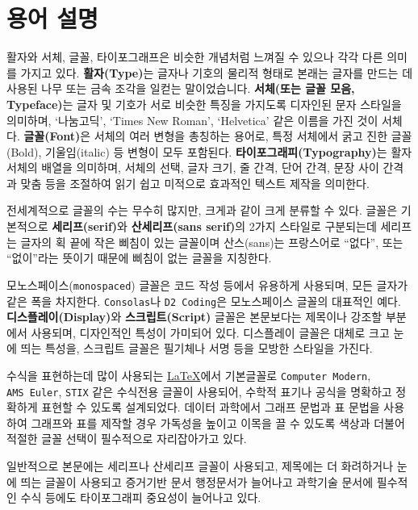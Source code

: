 \documentclass[
  letterpaper,
]{book}
\begin{document}
\hypertarget{uxc6a9uxc5b4-uxc124uxba85}{%
\section{용어 설명}\label{uxc6a9uxc5b4-uxc124uxba85}}

활자와 서체, 글꼴, 타이포그래프은 비슷한 개념처럼 느껴질 수 있으나 각각
다른 의미를 가지고 있다. \textbf{활자(Type)}는 글자나 기호의 물리적
형태로 본래는 글자를 만드는 데 사용된 나무 또는 금속 조각을 일컫는
말이었습니다. \textbf{서체(또는 글꼴 모음, Typeface)}는 글자 및 기호가
서로 비슷한 특징을 가지도록 디자인된 문자 스타일을 의미하며, `나눔고딕',
`Times New Roman', `Helvetica' 같은 이름을 가진 것이 서체다.
\textbf{글꼴(Font)}은 서체의 여러 변형을 총칭하는 용어로, 특정 서체에서
굵고 진한 글꼴(Bold), 기울임(italic) 등 변형이 모두 포함된다.
\textbf{타이포그래피(Typography)}는 활자 서체의 배열을 의미하며, 서체의
선택, 글자 크기, 줄 간격, 단어 간격, 문장 사이 간격과 맞춤 등을 조절하여
읽기 쉽고 미적으로 효과적인 텍스트 제작을 의미한다.

전세계적으로 글꼴의 수는 무수히 많지만, 크게과 같이 크게 분류할 수 있다.
글꼴은 기본적으로 \textbf{세리프(serif)}와 \textbf{산세리프(sans
serif)}의 2가지 스타일로 구분되는데 세리프는 글자의 획 끝에 작은 삐침이
있는 글꼴이며 산스(sans)는 프랑스어로 ``없다'', 또는 ``없이''라는 뜻이기
때문에 삐침이 없는 글꼴을 지칭한다.

모노스페이스(\texttt{monospaced}) 글꼴은 코드 작성 등에서 유용하게
사용되며, 모든 글자가 같은 폭을 차지한다. \texttt{Consolas}나
\texttt{D2\ Coding}은 모노스페이스 글꼴의 대표적인 예다.
\textbf{디스플레이(Display)}와 \textbf{스크립트(Script)} 글꼴은
본문보다는 제목이나 강조할 부분에서 사용되며, 디자인적인 특성이 가미되어
있다. 디스플레이 글꼴은 대체로 크고 눈에 띄는 특성을, 스크립트 글꼴은
필기체나 서명 등을 모방한 스타일을 가진다.

수식을 표현하는데 많이 사용되는 \href{http://example.org}{\LaTeX}에서
기본글꼴로 \texttt{Computer\ Modern}, \texttt{AMS\ Euler}, \texttt{STIX}
같은 수식전용 글꼴이 사용되어, 수학적 표기나 공식을 명확하고 정확하게
표현할 수 있도록 설계되었다. 데이터 과학에서 그래프 문법과 표 문법을
사용하여 그래프와 표를 제작할 경우 가독성을 높이고 이목을 끌 수 있도록
색상과 더불어 적절한 글꼴 선택이 필수적으로 자리잡아가고 있다.

일반적으로 본문에는 세리프나 산세리프 글꼴이 사용되고, 제목에는 더
화려하거나 눈에 띄는 글꼴이 사용되고 증거기반 문서 행정문서가 늘어나고
과학기술 문서에 필수적인 수식 등에도 타이포그래피 중요성이 늘어나고
있다.
\end{document}
